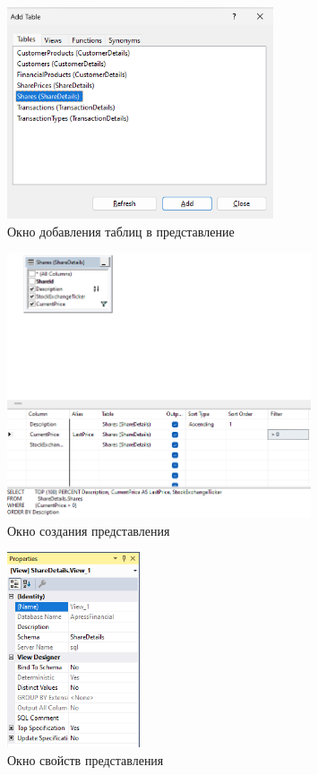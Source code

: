\documentclass[a4paper, 14pt]{extarticle}
\begin{document}
\begin{figure}[H]
  \centering
  \includegraphics[width=0.7\textwidth]{images/task-1/2.png}
  \caption{Окно добавления таблиц в представление}
  \label{fig:task-1-2}
\end{figure}

\begin{figure}[H]
  \centering
  \includegraphics[width=0.8\textwidth]{images/task-1/3.png}
  \caption{Окно создания представления}
  \label{fig:task-1-3}
\end{figure}

\begin{figure}[H]
  \centering
  \includegraphics[width=0.35\textwidth]{images/task-1/4.png}
  \caption{Окно свойств представления}
  \label{fig:task-1-4}
\end{figure}
\end{document}
